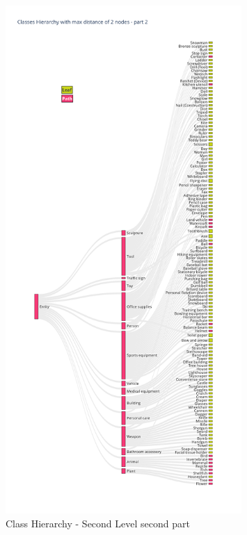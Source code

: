 \documentclass[11pt, a4paper, onecolumn]{article}
\begin{document}
\begin{appendices}
\begin{figure}[!ht]
		\includegraphics[width=0.8\textwidth]{lvl2_classes_pt2.png}
		\caption{\scriptsize Class Hierarchy - Second Level second part}
	\end{figure}
	

\end{appendices}
\end{document}
